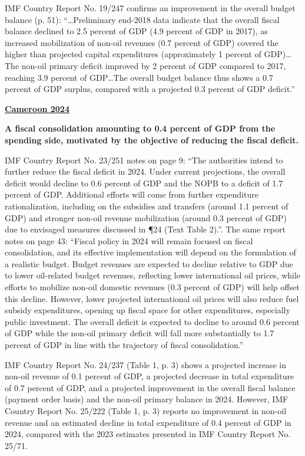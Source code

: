 IMF Country Report No. 19/247 confirms an improvement in the overall budget balance (p. 51): “…Preliminary end-2018 data indicate that the overall fiscal balance declined to 2.5 percent of GDP (4.9 percent of GDP in 2017), as increased mobilization of non-oil revenues (0.7 percent of GDP) covered the higher than projected capital expenditures (approximately 1 percent of GDP)…The non-oil primary deficit improved by 2 percent of GDP compared to 2017, reaching 3.9 percent of GDP…The overall budget balance thus shows a 0.7 percent of GDP surplus, compared with a projected 0.3 percent of GDP deficit.”

\textbf{\underline{Cameroon 2024}}

\textbf{A fiscal consolidation amounting to 0.4 percent of GDP from the spending side, motivated by the objective of reducing the fiscal deficit.}

IMF Country Report No. 23/251 notes on page 9: “The authorities intend to further reduce the fiscal deficit in 2024. Under current projections, the overall deficit would decline to 0.6 percent of GDP and the NOPB to a deficit of 1.7 percent of GDP. Additional efforts will come from further expenditure rationalization, including on the subsidies and transfers (around 1.1 percent of GDP) and stronger non-oil revenue mobilization (around 0.3 percent of GDP) due to envisaged measures discussed in ¶24 (Text Table 2).”. The same report notes on page 43: “Fiscal policy in 2024 will remain focused on fiscal consolidation, and its effective implementation will depend on the formulation of a realistic budget. Budget revenues are expected to decline relative to GDP due to lower oil-related budget revenues, reflecting lower international oil prices, while efforts to mobilize non-oil domestic revenues (0.3 percent of GDP) will help offset this decline. However, lower projected international oil prices will also reduce fuel subsidy expenditures, opening up fiscal space for other expenditures, especially public investment. The overall deficit is expected to decline to around 0.6 percent of GDP while the non-oil primary deficit will fall more substantially to 1.7 percent of GDP in line with the trajectory of fiscal consolidation.”

IMF Country Report No. 24/237 (Table 1, p. 3) shows a projected increase in non-oil revenue of 0.1 percent of GDP, a projected decrease in total expenditure of 0.7 percent of GDP, and a projected improvement in the overall fiscal balance (payment order basis) and the non-oil primary balance in 2024. However, IMF Country Report No. 25/222 (Table 1, p. 3) reports no improvement in non-oil revenue and an estimated decline in total expenditure of 0.4 percent of GDP in 2024, compared with the 2023 estimates presented in IMF Country Report No. 25/71. 

